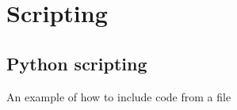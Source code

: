 \chapter{Scripting}
\label{ch:Scripting}

\section{Python scripting}
An example of how to include code from a file

